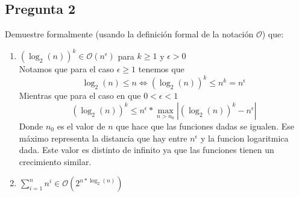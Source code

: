 \documentclass[letter]{article}
\begin{document}
	\begin{pregunta}{2}
		\section*{Pregunta 2}
		Demuestre formalmente (usando la definición formal de la notación $\mathcal{O}$) que:
		\begin{enumerate}
		\item $(\log_{2}(n))^{k}\in \mathcal{O}(n^{\epsilon})$ para $k\geq 1$ y $\epsilon >0$\\
		
		Notamos que para el caso $\epsilon \geq 1$ tenemos que 
		$$\log_{2}(n)\leq n \Leftrightarrow (\log_{2}(n))^{k}\leq n^{k}= n^{\epsilon}$$
		Mientras que para el caso en que $0<\epsilon<1$
		$$(\log_{2}(n))^{k}\leq n^{\epsilon}*\max_{n>n_0}|(\log_{2}(n))^{k}-n^{\epsilon}|$$
		Donde $n_0$ es el valor de $n$ que hace que las funciones dadas se igualen. Ese máximo representa la distancia que hay entre $n^{\epsilon}$ y la funcion logaritmica dada.
		Este valor es distinto de infinito ya que las funciones tienen un crecimiento similar.
		\item $\sum_{i=1}^{n}n^{i} \in \mathcal{O}(2^{n*\log_{2}(n)})$
		
		\end{enumerate}
		
	\end{pregunta}
\end{document}
